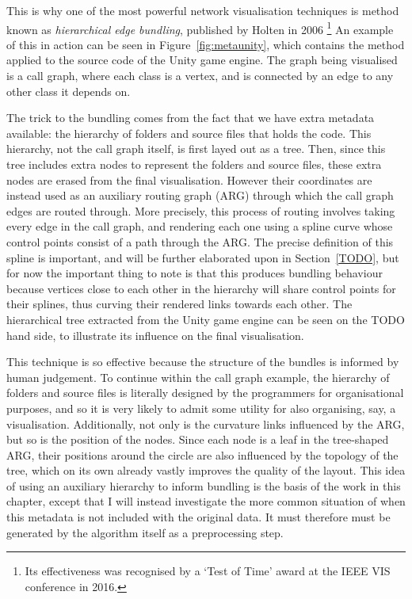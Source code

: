 This is why one of the most powerful network visualisation techniques is method known as \emph{hierarchical edge bundling}, published by Holten in 2006 \cite{Holten2006}\footnote{Its effectiveness was recognised by a `Test of Time' award at the IEEE VIS conference in 2016.}
An example of this in action can be seen in Figure~\ref{fig:metaunity}, which contains the method applied to the source code of the Unity game engine. The graph being visualised is a call graph, where each class is a vertex, and is connected by an edge to any other class it depends on. 

The trick to the bundling comes from the fact that we have extra metadata available: the hierarchy of folders and source files that holds the code.
This hierarchy, not the call graph itself, is first layed out as a tree. Then, since this tree includes extra nodes to represent the folders and source files, these extra nodes are erased from the final visualisation. However their coordinates are instead used as an auxiliary routing graph (ARG) through which the call graph edges are routed through.
More precisely, this process of routing involves taking every edge in the call graph, and rendering each one using a spline curve whose control points consist of a path through the ARG. The precise definition of this spline is important, and will be further elaborated upon in Section~\ref{TODO}, but for now the important thing to note is that this produces bundling behaviour because vertices close to each other in the hierarchy will share control points for their splines, thus curving their rendered links towards each other.
The hierarchical tree extracted from the Unity game engine can be seen on the TODO hand side, to illustrate its influence on the final visualisation. 

This technique is so effective because the structure of the bundles is informed by human judgement. To continue within the call graph example, the hierarchy of folders and source files is literally designed by the programmers for organisational purposes, and so it is very likely to admit some utility for also organising, say, a visualisation.
Additionally, not only is the curvature links influenced by the ARG, but so is the position of the nodes. Since each node is a leaf in the tree-shaped ARG, their positions around the circle are also influenced by the topology of the tree, which on its own already vastly improves the quality of the layout.
This idea of using an auxiliary hierarchy to inform bundling is the basis of the work in this chapter, except that I will instead investigate the more common situation of when this metadata is not included with the original data. It must therefore must be generated by the algorithm itself as a preprocessing step.

